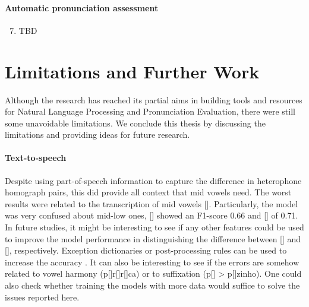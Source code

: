 \paragraph*{Automatic pronunciation assessment}
  \begin{enumerate}
    \setcounter{enumi}{6}
    \item TBD
  \end{enumerate}

\section*{Limitations and Further Work}\label{sec:limitations-further}

Although the research has reached its partial aims in building tools and resources for Natural Language Processing and Pronunciation Evaluation, there were still some unavoidable limitations. We conclude this thesis by discussing the limitations and providing ideas for future research.

\paragraph*{Text-to-speech}
Despite using part-of-speech information to capture the difference in heterophone homograph pairs, this did provide all context that mid vowels need. The worst results were related to the transcription of mid vowels []. Particularly, the model was very confused about mid-low ones, [] showed an F1-score 0.66 and [] of 0.71. In future studies, it might be interesting to see if any other features could be used to improve the model performance in distinguishing the difference between [] and [], respectively. Exception dictionaries or post-processing rules can be used to increase the accuracy \cite{Shulby2013}. It can also be interesting to see if the errors are somehow related to vowel harmony (p[]r[]r[]ca) or to suffixation (p[] > p[]zinho). One could also check whether training the models with more data would suffice to solve the issues reported here.

